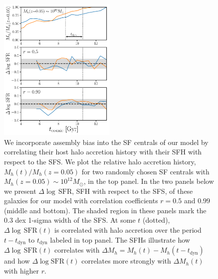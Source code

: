 \documentclass[12pt, letterpaper, preprint, tighten]{aastex62}
\newcommand{\logsfr}{\log\mathrm{SFR}}
\begin{document}
\begin{figure}
\begin{center}
\includegraphics[width=0.5\textwidth]{figs/Mhacc_dSFR.pdf}
\caption{We incorporate assembly bias into the SF centrals of our model by 
    correlating their host halo accretion history with their SFH with respect 
    to the SFS. We plot the relative halo accretion history, $M_h(t)/M_h(z{=}0.05)$ 
    for two randomly chosen SF centrals with $M_h(z{=}0.05)\sim10^{12}M_\odot$, 
    in the top panel. In the two panels below we present $\Delta\log\,\mathrm{SFR}$, 
    SFH with respect to the SFS, of these galaxies for our model with correlation 
    coefficients $r=0.5$ and $0.99$ (middle and bottom). The shaded region in these
    panels mark the $0.3$ dex 1-sigma width of the SFS. At some $t$ (dotted), 
    $\Delta\log\,\mathrm{SFR}(t)$ is correlated with halo accretion over the 
    period $t - t_\mathrm{dyn}$ to $t_\mathrm{dyn}$ labeled in top panel. The 
    SFHs illustrate how $\Delta\log\,\mathrm{SFR}(t)$ correlates with 
    $\Delta M_h = M_h(t) - M_h(t-t_\mathrm{dyn})$ and how $\Delta\logsfr(t)$ 
    correlates more strongly with $\Delta M_h(t)$ with higher $r$.}
\label{fig:mhacc_dsfr}
\end{center}
\end{figure}
\end{document}
